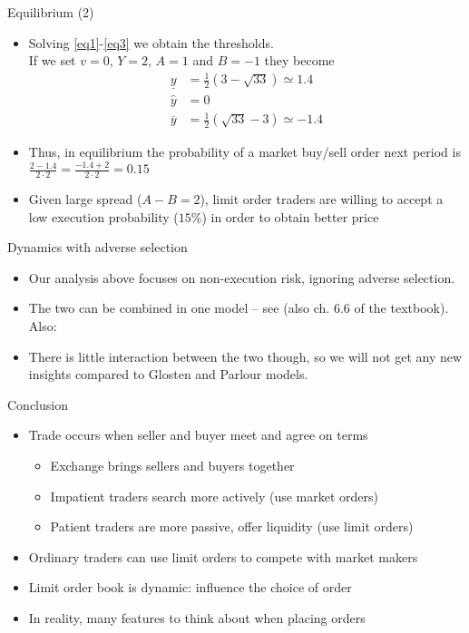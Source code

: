\documentclass[english,10pt
,aspectratio=169
]{beamer}
\begin{document}
\begin{frame}{Equilibrium (2)}
	\begin{itemize}
		\item Solving \eqref{eq1}-\eqref{eq3} we obtain the thresholds. 
		\\
		If we set $v=0$, $Y=2$, $A=1$ and $B=-1$ they become
		\begin{align*}
		\underline{y} 	& = \frac{1}{2}(3-\sqrt{33}) \simeq 1.4 \\
		\hat{y} 	& = 0 \\
		\overline{y} 		& = \frac{1}{2}(\sqrt{33}-3) \simeq -1.4 
		\end{align*}
		\item Thus, in equilibrium the probability of a market buy/sell order next period is $\frac{2-1.4}{2\cdot 2}=\frac{-1.4+2}{2 \cdot 2}=0.15$
		\item Given  large spread ($A-B=2$), limit order traders are willing to accept a low execution probability ($15\%$) in order to obtain better price
	\end{itemize}
\end{frame}


\begin{frame}{Dynamics with adverse selection}
	\begin{itemize}
		\item Our analysis above focuses on non-execution risk, ignoring adverse selection.
		\item The two can be combined in one model -- see \cite{foucault_order_1999} (also ch. 6.6 of the textbook). Also: \hyperlink{adverse}{}
		\item There is little interaction between the two though, so we will not get any new insights compared to Glosten and Parlour models.
	\end{itemize}
\end{frame}


\begin{frame}[label=parlourmain]{Conclusion}
	\begin{itemize}
		\item Trade occurs when seller and buyer meet and agree on terms
		\begin{itemize}
			\item Exchange brings sellers and buyers together
			\item Impatient traders search more actively (use market orders)
			\item Patient traders are more passive, offer liquidity (use limit orders)
		\end{itemize}
		\item Ordinary traders can use limit orders to compete with market makers
		\item Limit order book is dynamic: influence the choice of order
		\item In reality, many features to think about when placing orders
	\end{itemize}
\end{frame}
\end{document}
